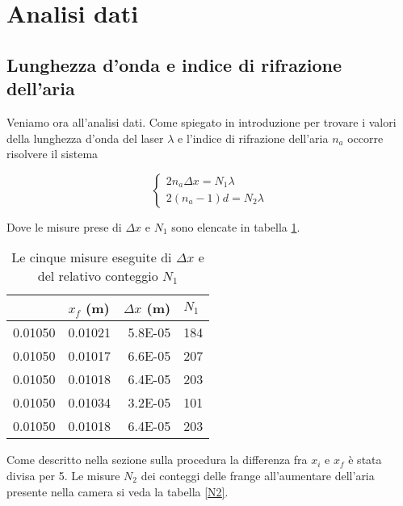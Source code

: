 \documentclass[a4paper,11pt]{article}
\begin{document}
	\section{Analisi dati}
	
	\subsection{Lunghezza d'onda e indice di rifrazione dell'aria}
	Veniamo ora all'analisi dati. Come spiegato in introduzione per trovare i valori della lunghezza d'onda del laser $\lambda$ e l'indice di rifrazione dell'aria $n _a$ occorre risolvere il sistema
	
	\begin{equation}
		\begin{cases}
			2n _a \Delta x = N _1 \lambda \\ 2(n_a -1)d =N_2 \lambda
		\end{cases}	
	\end{equation}
	
	Dove le misure prese di $\Delta x$ e $N _1$ sono elencate in tabella \ref{deltax}.
	
	\begin{table}[htbp]
  \centering
  \caption{Le cinque misure eseguite di $\Delta x$ e del relativo conteggio $N _1$}
    \begin{tabular}{rrrr}
    \bottomrule
    \rowcolor[rgb]{ .267,  .447,  .769} \multicolumn{1}{l}{\textcolor[rgb]{ 1,  1,  1}{\textbf{$x _i$ (m)}}} & \multicolumn{1}{l}{\textcolor[rgb]{ 1,  1,  1}{\textbf{$x _f$ (m)}}} & \multicolumn{1}{l}{\textcolor[rgb]{ 1,  1,  1}{\textbf{$\Delta x$ (m)}}} & \multicolumn{1}{l}{\textcolor[rgb]{ 1,  1,  1}{\textbf{$N _1$}}} \\
    \toprule
   \rowcolor[rgb]{ .851,  .851,  .851} 0.01050 & 0.01021 & 5.8E-05 & 184 \\
    0.01050 & 0.01017 & 6.6E-05 & 207 \\
    \rowcolor[rgb]{ .851,  .851,  .851} 0.01050 & 0.01018 & 6.4E-05 & 203 \\
    0.01050 & 0.01034 & 3.2E-05 & 101 \\
    \rowcolor[rgb]{ .851,  .851,  .851} 0.01050 & 0.01018 & 6.4E-05 & 203 \\
    \toprule
    \end{tabular}%
  \label{deltax}%
\end{table}%
	
	Come descritto nella sezione sulla procedura la differenza fra $x _i$ e $x _f$ è stata divisa per 5. Le misure $N _2$ dei conteggi delle frange all'aumentare dell'aria presente nella camera si veda la tabella \ref{N2}.
	
\end{document}
